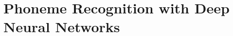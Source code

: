 \documentclass{nada-ten}
\begin{document}

\section{Phoneme Recognition with Deep Neural Networks}
\label{sec:dnn}
\end{document}
